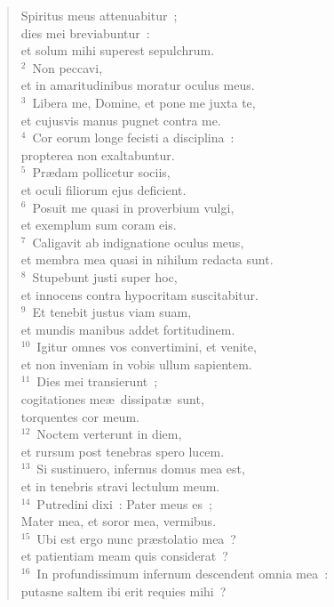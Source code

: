 \begin{flushleft}\begin{verse}\vspace{-19pt}\hspace{6pt}Spiritus meus attenuabitur~;\\\hspace{6pt} dies mei breviabuntur~:\\ et solum mihi superest sepulchrum.\\
${}^{2}$~Non peccavi,\\ et in amaritudinibus moratur oculus meus.\\
${}^{3}$~Libera me, Domine, et pone me juxta te,\\ et cujusvis manus pugnet contra me.\\
${}^{4}$~Cor eorum longe fecisti a disciplina~:\\ propterea non exaltabuntur.\\
${}^{5}$~Pr\ae dam pollicetur sociis,\\ et oculi filiorum ejus deficient.\\
${}^{6}$~Posuit me quasi in proverbium vulgi,\\ et exemplum sum coram eis.\\
${}^{7}$~Caligavit ab indignatione oculus meus,\\ et membra mea quasi in nihilum redacta sunt.\\
${}^{8}$~Stupebunt justi super hoc,\\ et innocens contra hypocritam suscitabitur.\\
${}^{9}$~Et tenebit justus viam suam,\\ et mundis manibus addet fortitudinem.\\
${}^{10}$~Igitur omnes vos convertimini, et venite,\\ et non inveniam in vobis ullum sapientem.\\
${}^{11}$~Dies mei transierunt~;\\ cogitationes me\ae\ dissipat\ae\ sunt,\\ torquentes cor meum.\\
${}^{12}$~Noctem verterunt in diem,\\ et rursum post tenebras spero lucem.\\
${}^{13}$~Si sustinuero, infernus domus mea est,\\ et in tenebris stravi lectulum meum.\\
${}^{14}$~Putredini dixi~: Pater meus es~;\\ Mater mea, et soror mea, vermibus.\\
${}^{15}$~Ubi est ergo nunc pr\ae stolatio mea~?\\ et patientiam meam quis considerat~?\\
${}^{16}$~In profundissimum infernum descendent omnia mea~:\\ putasne saltem ibi erit requies mihi~?\end{verse}\end{flushleft}



